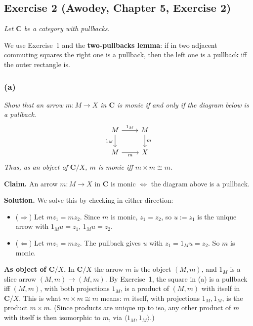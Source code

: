 \subsection{Exercise 2 (Awodey, Chapter 5, Exercise 2)}
\label{ex:2}

\textit{Let $\mathbf{C}$ be a category with pullbacks.}

We use Exercise~1 and the \textbf{two-pullbacks lemma}: if in two adjacent
commuting squares the right one is a pullback, then the left one is a pullback
iff the outer rectangle is.

\subsubsection*{(a)}

\textit{Show that an arrow $m : M \rightarrow X$ in $\mathbf{C}$ is monic if
and only if the diagram below is a pullback.}
\[
  \begin{tikzcd}
    M \ar[r, "1_{M}"] \ar[d, "1_{M}"'] & M \ar[d, "m"] \\
    M \ar[r, "m"'] & X
  \end{tikzcd}
\]
\textit{Thus, as an object of $\mathbf{C}/X$, $m$ is monic iff $m \times m \cong m$.}

\medskip

\textbf{Claim.} An arrow $m: M \to X$ in $\mathbf{C}$ is monic
$\Leftrightarrow$ the diagram above is a pullback.

\textbf{Solution.} We solve this by checking in either direction:

\begin{itemize}
  \item ($\Rightarrow$) Let $m z_1 = m z_2$. Since $m$ is monic, $z_1 = z_2$, so
    $u := z_1$ is the unique arrow with $1_M u = z_1$, $1_M u = z_2$.
  \item ($\Leftarrow$) Let $m z_1 = m z_2$. The pullback gives $u$ with $z_1 =
    1_M u = z_2$. So $m$ is monic.
\end{itemize}

\medskip
\textbf{As object of $\mathbf{C}/X$.} In $\mathbf{C}/X$ the arrow $m$ is the
object $(M,m)$, and $1_M$ is a slice arrow $(M,m) \to (M,m)$. By Exercise~1,
the square in (a) is a pullback iff $(M,m)$, with both projections $1_M$, is a
product of $(M,m)$ with itself in $\mathbf{C}/X$. This is what $m \times m
\cong m$ means: $m$ itself, with projections $1_M, 1_M$, is the product $m
\times m$. (Since products are unique up to iso, any other product of $m$ with
itself is then isomorphic to $m$, via $\langle 1_M, 1_M \rangle$.)


